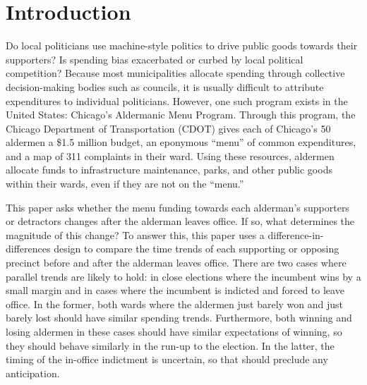 \section{Introduction}\label{sec:Introduction}

Do local politicians use machine-style politics to drive public goods towards their supporters? Is spending bias exacerbated or curbed by local political competition?
Because most municipalities allocate spending through collective decision-making bodies such as councils, it is usually difficult to attribute expenditures to individual politicians.
However, one such program exists in the United States: Chicago's Aldermanic Menu Program.
Through this program, the Chicago Department of Transportation (CDOT) gives each of Chicago's 50 aldermen a \$1.5 million budget, an eponymous ``menu'' of common expenditures, and a map of 311 complaints in their ward.
Using these resources, aldermen allocate funds to infrastructure maintenance, parks, and other public goods within their wards, even if they are not on the ``menu.''

This paper asks whether the menu funding towards each alderman's supporters or detractors changes after the alderman leaves office.
If so, what determines the magnitude of this change? 
To answer this, this paper uses a difference-in-differences design to compare the time trends of each supporting or opposing precinct before and after the alderman leaves office.
There are two cases where parallel trends are likely to hold: in close elections where the incumbent wins by a small margin and in cases where the incumbent is indicted and forced to leave office.
In the former, both wards where the aldermen just barely won and just barely lost should have similar spending trends.
Furthermore, both winning and losing aldermen in these cases should have similar expectations of winning, so they should behave similarly in the run-up to the election.
In the latter, the timing of the in-office indictment is uncertain, so that should preclude any anticipation.


